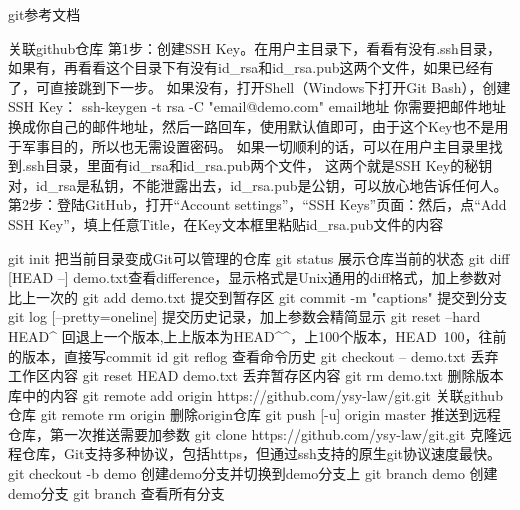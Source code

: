 git参考文档

关联github仓库
第1步：创建SSH Key。在用户主目录下，看看有没有.ssh目录，
       如果有，再看看这个目录下有没有id_rsa和id_rsa.pub这两个文件，如果已经有了，可直接跳到下一步。
       如果没有，打开Shell（Windows下打开Git Bash），创建SSH Key：
       ssh-keygen -t rsa -C "email@demo.com" email地址	 
       你需要把邮件地址换成你自己的邮件地址，然后一路回车，使用默认值即可，由于这个Key也不是用于军事目的，所以也无需设置密码。
       如果一切顺利的话，可以在用户主目录里找到.ssh目录，里面有id_rsa和id_rsa.pub两个文件，
	   这两个就是SSH Key的秘钥对，id_rsa是私钥，不能泄露出去，id_rsa.pub是公钥，可以放心地告诉任何人。	
第2步：登陆GitHub，打开“Account settings”，“SSH Keys”页面：然后，点“Add SSH Key”，填上任意Title，在Key文本框里粘贴id_rsa.pub文件的内容	   

git init                   把当前目录变成Git可以管理的仓库
git status                 展示仓库当前的状态
git diff [HEAD --] demo.txt查看difference，显示格式是Unix通用的diff格式，加上参数对比上一次的
git add  demo.txt          提交到暂存区
git commit -m "captions"   提交到分支
git log [--pretty=oneline] 提交历史记录，加上参数会精简显示
git reset --hard HEAD^     回退上一个版本,上上版本为HEAD^^，上100个版本，HEAD~100，往前的版本，直接写commit id
git reflog                 查看命令历史
git checkout -- demo.txt   丢弃工作区内容
git reset HEAD demo.txt    丢弃暂存区内容 
git rm demo.txt            删除版本库中的内容
git remote add origin https://github.com/ysy-law/git.git  关联github仓库
git remote rm origin                                      删除origin仓库
git push [-u] origin master                               推送到远程仓库，第一次推送需要加参数
git clone https://github.com/ysy-law/git.git              克隆远程仓库，Git支持多种协议，包括https，但通过ssh支持的原生git协议速度最快。
git checkout -b demo       创建demo分支并切换到demo分支上
git branch demo            创建demo分支
git branch                 查看所有分支